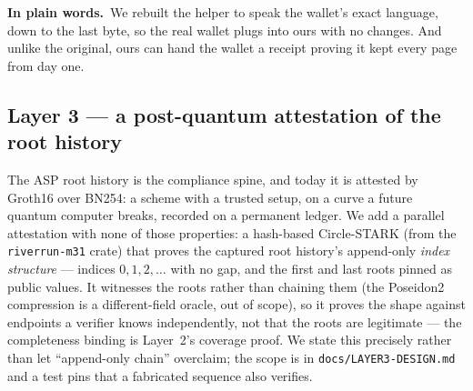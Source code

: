 \documentclass[11pt]{article}
\newcommand{\intuition}[1]{%
  \par\vspace{0.5em}%
  \noindent\colorbox{soft}{\parbox{\dimexpr\linewidth-2\fboxsep}{%
  \small\textbf{\color{klein}In plain words.}\ #1}}%
  \par\vspace{0.5em}%
}
\newcommand{\code}[1]{\texttt{\small #1}}
\begin{document}
\intuition{We rebuilt the helper to speak the wallet's exact language, down to the
last byte, so the real wallet plugs into ours with no changes. And unlike the
original, ours can hand the wallet a receipt proving it kept every page from day
one.}

\subsection{Layer 3 --- a post-quantum attestation of the root history}

The ASP root history is the compliance spine, and today it is attested by
Groth16 over BN254: a scheme with a trusted setup, on a curve a future quantum
computer breaks, recorded on a permanent ledger. We add a parallel attestation
with none of those properties: a hash-based Circle-STARK (from the
\code{riverrun-m31} crate) that proves the captured root history's append-only
\emph{index structure} --- indices $0,1,2,\dots$ with no gap, and the first and
last roots pinned as public values. It witnesses the roots rather than chaining
them (the Poseidon2 compression is a different-field oracle, out of scope), so it
proves the shape against endpoints a verifier knows independently, not that the
roots are legitimate --- the completeness binding is Layer~2's coverage proof.
We state this precisely rather than let ``append-only chain'' overclaim; the
scope is in \code{docs/LAYER3-DESIGN.md} and a test pins that a fabricated
sequence also verifies.
\end{document}
